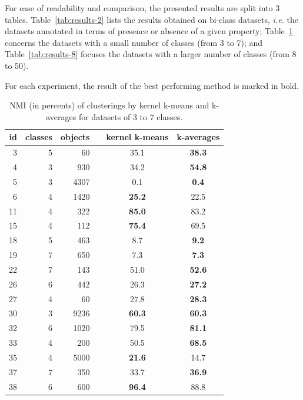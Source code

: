 \documentclass[natbib,smallextended]{svjour3}
\begin{document}
For ease of readability and comparison, the presented results are split into 3 tables. Table~\ref{tab:results-2} lists the results obtained on bi-class datasets, \textit{i.e.} the datasets annotated in terms of presence or absence of a given property; Table~\ref{tab:results-37} concerns the datasets with a small number of classes (from 3 to 7); and Table~\ref{tab:results-8} focuses the datasets with a larger number of classes (from 8 to 50).

For each experiment, the result of the best performing method is marked in bold.


\begin{table}
\begin{center}
\caption{NMI (in percents) of clusterings by kernel k-means and k-averages for datasets of 3 to 7 classes.}
\label{tab:results-37}
\begin{tabular}{rrrccc}
id & classes & objects & & kernel k-means & k-averages \\
\hline
 3 & 5 &   60 &  & 35.1 & \textbf{38.3} \\
 4 & 3 &  930 &  & 34.2 & \textbf{54.8} \\
 5 & 3 & 4307 &  & 0.1 & \textbf{0.4} \\
 6 & 4 & 1420 &  & \textbf{25.2} & 22.5 \\
11 & 4 &  322 &  & \textbf{85.0} & 83.2 \\
15 & 4 &  112 &  & \textbf{75.4} & 69.5 \\
18 & 5 &  463 &  & 8.7 & \textbf{9.2} \\
19 & 7 &  650 &  & 7.3 & \textbf{7.3} \\
22 & 7 &  143 &  & 51.0 & \textbf{52.6} \\
26 & 6 &  442 &  & 26.3 & \textbf{27.2} \\
27 & 4 &   60 &  & 27.8 & \textbf{28.3} \\
30 & 3 & 9236 &  & \textbf{60.3} & \textbf{60.3} \\
32 & 6 & 1020 &  & 79.5 & \textbf{81.1} \\
33 & 4 &  200 &  & 50.5 & \textbf{68.5} \\
35 & 4 & 5000 &  & \textbf{21.6} & 14.7 \\
37 & 7 &  350 &  & 33.7 & \textbf{36.9} \\
38 & 6 &  600 &  & \textbf{96.4} & 88.8 \\
\end{tabular}
\end{center}
\end{table}
\end{document}
